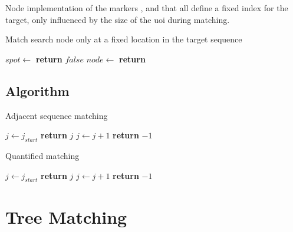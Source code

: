 \documentclass[11pt,a4paper]{report}
\begin{document}
Node implementation of the markers ,  and  that all define a fixed index for the target, only influenced by the size of the \ac{uoi} during matching.

\begin{algorithm}[H]
	\caption[Fixed spot matching]{Match search node only at a fixed location in the target sequence}
	\label{alg:match-spot}
	\begin{algorithmic}[1]
		\State $spot \gets$ 
			\State \textbf{return} $false$
		\EndIf
		\State $node \gets$ 
		\State \textbf{return} 
		\EndProcedure
	\end{algorithmic}
\end{algorithm}

\section{Algorithm}
\label{sec:seq-alg}

\begin{algorithm}[H]
	\caption{Adjacent sequence matching}
	\label{alg:match-adjacent}
	\begin{algorithmic}[1]
		 
		\State $j \gets j_{start}$
		\State \textbf{return} $j$
		\EndIf
		\State $j \gets j + 1$
		\EndWhile
		\State \textbf{return} $-1$
		\EndProcedure
	\end{algorithmic}
\end{algorithm}

\begin{algorithm}[H]
	\caption{Quantified matching}
	\label{alg:match-quantified}
	\begin{algorithmic}[1]
		 
		\State $j \gets j_{start}$
		\State \textbf{return} $j$
		\EndIf
		\State $j \gets j + 1$
		\EndWhile
		\State \textbf{return} $-1$
		\EndProcedure
	\end{algorithmic}
\end{algorithm}



\chapter{Tree Matching}
\label{chap:tree-matching}

\begin{appendices}

\end{appendices}
\end{document}
